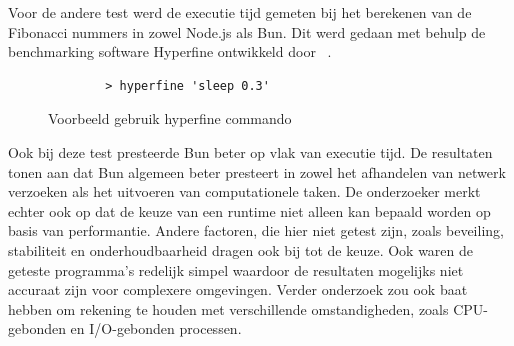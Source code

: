 Voor de andere test werd de executie tijd gemeten bij het berekenen van de Fibonacci nummers in zowel Node.js als Bun. 
Dit werd gedaan met behulp de benchmarking software Hyperfine ontwikkeld door ~\textcite{Pompeii2024}.
\begin{figure}[H]
    \centering
    \begin{verbatim}
        > hyperfine 'sleep 0.3'
        \end{verbatim}
        \caption{Voorbeeld gebruik hyperfine commando \autocite{Pompeii2024}}
\end{figure}
Ook bij deze test presteerde Bun beter op vlak van executie tijd. De resultaten tonen aan dat 
Bun algemeen beter presteert in zowel het afhandelen van netwerk verzoeken als het uitvoeren van computationele taken.
De onderzoeker merkt echter ook op dat de keuze van een runtime niet alleen kan bepaald worden op basis van 
performantie. Andere factoren, die hier niet getest zijn, zoals beveiling, stabiliteit en onderhoudbaarheid dragen ook bij tot de keuze. 
Ook waren de geteste programma's redelijk simpel waardoor de resultaten mogelijks niet accuraat zijn voor complexere omgevingen. 
Verder onderzoek zou ook baat hebben om rekening te houden met verschillende omstandigheden, zoals CPU-gebonden
en I/O-gebonden processen.
